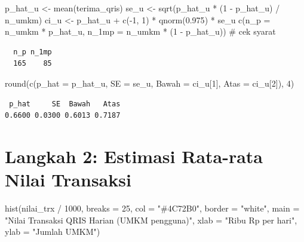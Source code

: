 \documentclass[
  indonesian,
  letterpaper,
]{book}
\newenvironment{Shaded}{\begin{snugshade}}{\end{snugshade}}
\newcommand{\AttributeTok}[1]{\textcolor[rgb]{0.40,0.45,0.13}{#1}}
\newcommand{\CommentTok}[1]{\textcolor[rgb]{0.37,0.37,0.37}{#1}}
\newcommand{\DecValTok}[1]{\textcolor[rgb]{0.68,0.00,0.00}{#1}}
\newcommand{\FloatTok}[1]{\textcolor[rgb]{0.68,0.00,0.00}{#1}}
\newcommand{\FunctionTok}[1]{\textcolor[rgb]{0.28,0.35,0.67}{#1}}
\newcommand{\NormalTok}[1]{\textcolor[rgb]{0.00,0.23,0.31}{#1}}
\newcommand{\OtherTok}[1]{\textcolor[rgb]{0.00,0.23,0.31}{#1}}
\newcommand{\SpecialCharTok}[1]{\textcolor[rgb]{0.37,0.37,0.37}{#1}}
\newcommand{\StringTok}[1]{\textcolor[rgb]{0.13,0.47,0.30}{#1}}
\begin{document}
\begin{Shaded}
\begin{Highlighting}[]
\NormalTok{p\_hat\_u }\OtherTok{\textless{}{-}} \FunctionTok{mean}\NormalTok{(terima\_qris)}
\NormalTok{se\_u }\OtherTok{\textless{}{-}} \FunctionTok{sqrt}\NormalTok{(p\_hat\_u }\SpecialCharTok{*}\NormalTok{ (}\DecValTok{1} \SpecialCharTok{{-}}\NormalTok{ p\_hat\_u) }\SpecialCharTok{/}\NormalTok{ n\_umkm)}
\NormalTok{ci\_u }\OtherTok{\textless{}{-}}\NormalTok{ p\_hat\_u }\SpecialCharTok{+} \FunctionTok{c}\NormalTok{(}\SpecialCharTok{{-}}\DecValTok{1}\NormalTok{, }\DecValTok{1}\NormalTok{) }\SpecialCharTok{*} \FunctionTok{qnorm}\NormalTok{(}\FloatTok{0.975}\NormalTok{) }\SpecialCharTok{*}\NormalTok{ se\_u}
\FunctionTok{c}\NormalTok{(}\AttributeTok{n\_p =}\NormalTok{ n\_umkm }\SpecialCharTok{*}\NormalTok{ p\_hat\_u, }\AttributeTok{n\_1mp =}\NormalTok{ n\_umkm }\SpecialCharTok{*}\NormalTok{ (}\DecValTok{1} \SpecialCharTok{{-}}\NormalTok{ p\_hat\_u)) }\CommentTok{\# cek syarat}
\end{Highlighting}
\end{Shaded}

\begin{verbatim}
  n_p n_1mp 
  165    85 
\end{verbatim}

\begin{Shaded}
\begin{Highlighting}[]
\FunctionTok{round}\NormalTok{(}\FunctionTok{c}\NormalTok{(}\AttributeTok{p\_hat =}\NormalTok{ p\_hat\_u, }\AttributeTok{SE =}\NormalTok{ se\_u, }\AttributeTok{Bawah =}\NormalTok{ ci\_u[}\DecValTok{1}\NormalTok{], }\AttributeTok{Atas =}\NormalTok{ ci\_u[}\DecValTok{2}\NormalTok{]), }\DecValTok{4}\NormalTok{)}
\end{Highlighting}
\end{Shaded}

\begin{verbatim}
 p_hat     SE  Bawah   Atas 
0.6600 0.0300 0.6013 0.7187 
\end{verbatim}

\section{Langkah 2: Estimasi Rata-rata Nilai
Transaksi}\label{langkah-2-estimasi-rata-rata-nilai-transaksi}

\begin{Shaded}
\begin{Highlighting}[]
\FunctionTok{hist}\NormalTok{(nilai\_trx }\SpecialCharTok{/} \DecValTok{1000}\NormalTok{, }\AttributeTok{breaks =} \DecValTok{25}\NormalTok{, }\AttributeTok{col =} \StringTok{"\#4C72B0"}\NormalTok{, }\AttributeTok{border =} \StringTok{"white"}\NormalTok{,}
\AttributeTok{main =} \StringTok{"Nilai Transaksi QRIS Harian (UMKM pengguna)"}\NormalTok{, }\AttributeTok{xlab =} \StringTok{"Ribu Rp per hari"}\NormalTok{,}
\AttributeTok{ylab =} \StringTok{"Jumlah UMKM"}\NormalTok{)}
\end{Highlighting}
\end{Shaded}
\end{document}
